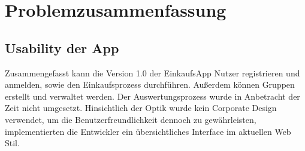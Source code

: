 \documentclass[12pt,a4paper]{article}
\begin{document}
\newpage
\section{Problemzusammenfassung}
\subsection{Usability der App}
Zusammengefasst kann die Version 1.0 der EinkaufsApp Nutzer registrieren und anmelden, sowie den Einkaufsprozess durchführen. Außerdem können Gruppen erstellt und verwaltet werden. Der Auswertungsprozess wurde in Anbetracht der Zeit nicht umgesetzt. Hinsichtlich der Optik wurde kein Corporate Design verwendet, um die Benutzerfreundlichkeit dennoch zu gewährleisten, implementierten die Entwickler ein übersichtliches Interface im aktuellen Web Stil.
\end{document}
